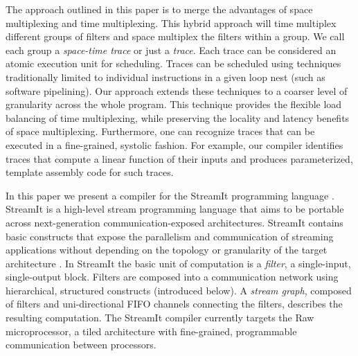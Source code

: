 The approach outlined in this paper is to merge the advantages of
space multiplexing and time multiplexing.  This hybrid approach will
time multiplex different groups of filters and space multiplex the
filters within a group.  We call each group a {\it space-time trace}
or just a {\it trace}. Each trace can be considered an atomic
execution unit for scheduling.  Traces can be scheduled using
techniques traditionally limited to individual instructions in a given
loop nest (such as software pipelining). Our approach extends these
techniques to a coarser level of granularity across the whole program.
This technique provides the flexible load balancing of time
multiplexing, while preserving the locality and latency benefits of
space multiplexing.  Furthermore, one can recognize traces that can be
executed in a fine-grained, systolic fashion.  For example, our
compiler identifies traces that compute a linear function of their
inputs and produces parameterized, template assembly code for such
traces.

In this paper we present a compiler for the StreamIt programming
language \cite{streamitcc}.  StreamIt is a high-level stream
programming language that aims to be portable across next-generation
communication-exposed architectures.  StreamIt contains basic
constructs that expose the parallelism and communication of streaming
applications without depending on the topology or granularity of the
target architecture \cite{streamit-asplos}. In StreamIt the basic unit
of computation is a {\it filter}, a single-input, single-output block.
Filters are composed into a communication network using hierarchical,
structured constructs (introduced below).  A {\it stream graph},
composed of filters and uni-directional FIFO channels connecting the
filters, describes the resulting computation. The StreamIt compiler
currently targets the Raw microprocessor, a tiled architecture with
fine-grained, programmable communication between processors.

